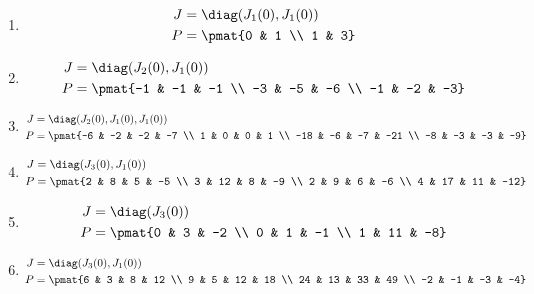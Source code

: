 \begin{enumerate}
\item

\begin{align*}
J &= \diag(J_{1}(0), J_{1}(0))\\
P &= \pmat{0 & 1 \\ 1 & 3}
\end{align*}

\item

\begin{align*}
J &= \diag(J_{2}(0), J_{1}(0))\\
P &= \pmat{-1 & -1 & -1 \\ -3 & -5 & -6 \\ -1 & -2 & -3}
\end{align*}

\item

\begin{align*}
J &= \diag(J_{2}(0), J_{1}(0), J_{1}(0))\\
P &= \pmat{-6 & -2 & -2 & -7 \\ 1 & 0 & 0 & 1 \\ -18 & -6 & -7 & -21 \\ -8 & -3 & -3 & -9}
\end{align*}

\item

\begin{align*}
J &= \diag(J_{3}(0), J_{1}(0))\\
P &= \pmat{2 & 8 & 5 & -5 \\ 3 & 12 & 8 & -9 \\ 2 & 9 & 6 & -6 \\ 4 & 17 & 11 & -12}
\end{align*}

\item

\begin{align*}
J &= \diag(J_{3}(0))\\
P &= \pmat{0 & 3 & -2 \\ 0 & 1 & -1 \\ 1 & 11 & -8}
\end{align*}

\item

\begin{align*}
J &= \diag(J_{3}(0), J_{1}(0))\\
P &= \pmat{6 & 3 & 8 & 12 \\ 9 & 5 & 12 & 18 \\ 24 & 13 & 33 & 49 \\ -2 & -1 & -3 & -4}
\end{align*}


\end{enumerate}
